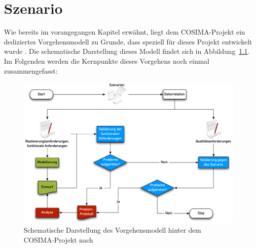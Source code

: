 
\chapter{Szenario} %
\label{cha:szenario}

  Wie bereits im vorangegangen Kapitel erwähnt, liegt dem COSIMA-Projekt ein dediziertes Vorgehensmodell zu Grunde, dass speziell für dieses Projekt entwickelt wurde \citep[S. 7]{bericht}. Die schematische Darstellung dieses Modell findet sich in Abbildung~\ref{fig:vorgehensmodell}. Im Folgenden werden die Kernpunkte dieses Vorgehens noch einmal zusammengefasst:

  \begin{figure}[!ht]
    \centering
      \includegraphics[width=.9\textwidth]{images/Vorgehensmodell}
    \caption{Schematische Darstellung des Vorgehensmodell hinter dem COSIMA-Projekt nach \citep{bericht}}
    \label{fig:vorgehensmodell}
  \end{figure}

